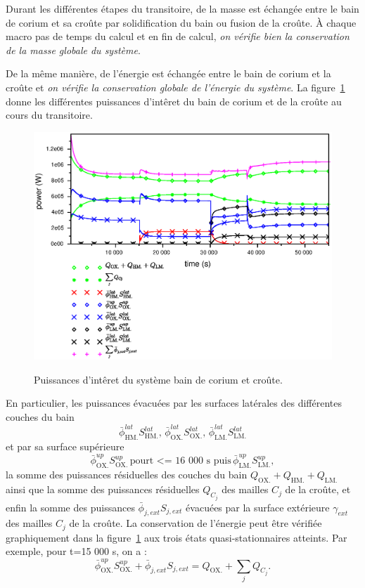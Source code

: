 Durant les différentes étapes du transitoire, de la masse est échangée entre le bain de corium et sa croûte par solidification du bain ou fusion de la croûte. À chaque macro pas de temps du calcul et en fin de calcul, \emph{on vérifie bien la conservation de la masse globale du système}.

De la même manière, de l'énergie est échangée entre le bain de corium et la croûte et \emph{on vérifie la conservation globale de l'énergie du système}. La figure~\ref{fig:thermal_balance} donne les différentes puissances d'intêret du bain de corium et de la croûte au cours du transitoire.
\begin{figure}
\centering
\includegraphics[width=\textwidth, keepaspectratio=true]{Figures/thermal_balance.eps}\\
\caption{Puissances d'intêret du système bain de corium et croûte.}
\label{fig:thermal_balance}
\end{figure}
En particulier, les puissances évacuées par les surfaces latérales des différentes couches du bain 
\begin{equation*}
\bar{\phi}^{lat}_\textrm{HM.}S^{lat}_\textrm{HM.},\,\bar{\phi}^{lat}_\textrm{OX.}S^{lat}_\textrm{OX.},\,\bar{\phi}^{lat}_\textrm{LM.}S^{lat}_\textrm{LM.}
\end{equation*}
et par sa surface supérieure 
\begin{equation*}
\bar{\phi}^{up}_\textrm{OX.}S^{up}_\textrm{OX.}\,\text{pourt <= 16 000 s  puis}\,\bar{\phi}^{up}_\textrm{LM.}S^{up}_\textrm{LM.},
\end{equation*}
la somme des puissances résiduelles des couches du bain $Q_\textrm{OX.}+Q_\textrm{HM.}+Q_\textrm{LM.}$ ainsi que la somme des puissances résiduelles $Q_{C_j}$ des mailles $C_j$ de la croûte, et enfin la somme des puissances $\bar{\phi}_{j,ext}S_{j,ext}$ évacuées par la surface extérieure $\gamma_{ext}$ des mailles $C_j$ de la croûte. La conservation de l'énergie peut être vérifiée graphiquement dans la figure~\ref{fig:thermal_balance} aux trois états quasi-stationnaires atteints. Par exemple, pour t=15 000 s, on a :
\begin{equation}
\bar{\phi}^{up}_\textrm{OX.}S^{up}_\textrm{OX.} + \bar{\phi}_{j,ext}S_{j,ext} = Q_\textrm{OX.} + \sum_j Q_{C_j}.
\end{equation}

